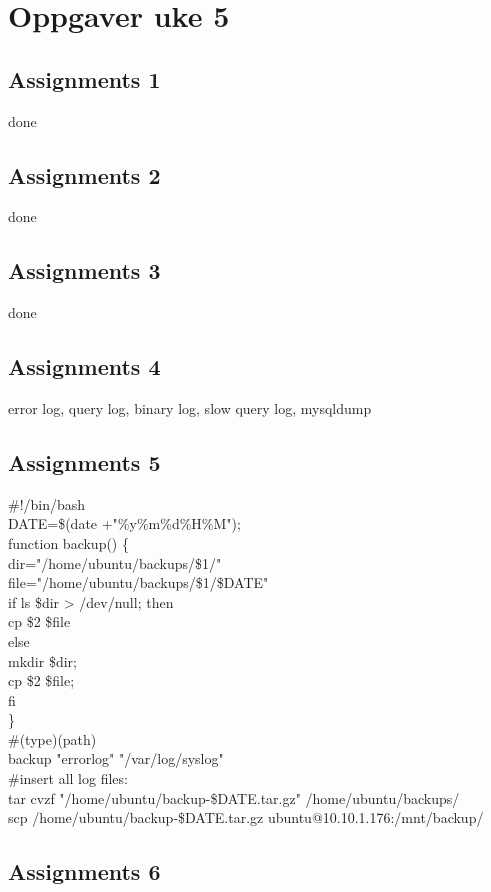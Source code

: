 \section{Oppgaver uke 5}

\subsection{Assignments 1} 
done
\subsection{Assignments 2}
done
\subsection{Assignments 3}
done
\subsection{Assignments 4} 
error log, query log, binary log, slow query log, mysqldump

\subsection{Assignments 5} 
\#!/bin/bash\\

DATE=\$(date +"\%y\%m\%d\%H\%M");\\

function backup() \{\\
dir="/home/ubuntu/backups/\$1/"\\
file="/home/ubuntu/backups/\$1/\$DATE"\\
        if ls \$dir > /dev/null; then\\
                cp \$2 \$file\\
        else\\
                mkdir \$dir;\\
                cp \$2 \$file;\\
        fi\\
\}\\

\#(type)(path)\\
backup "errorlog" "/var/log/syslog"\\
\#insert all log files:\\

tar cvzf "/home/ubuntu/backup-\$DATE.tar.gz" /home/ubuntu/backups/\\

scp /home/ubuntu/backup-\$DATE.tar.gz ubuntu@10.10.1.176:/mnt/backup/

\subsection{Assignments 6} 